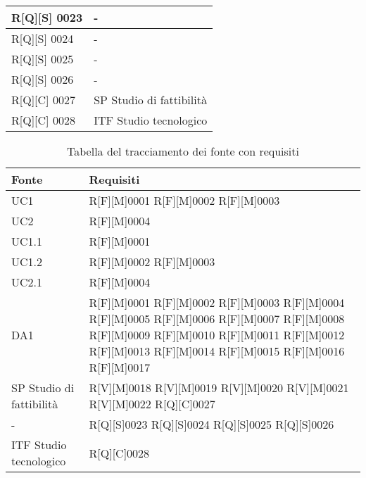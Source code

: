 \begin{center}
\begin{longtable}{|p{3cm}|p{3cm}|}
            \hline
            R[Q][S] 0023    & -  \\
            \hline
            R[Q][S] 0024    & -  \\
            \hline
            R[Q][S] 0025    & -  \\
            \hline
            R[Q][S] 0026    & -  \\
            \hline
            R[Q][C] 0027    & SP Studio di fattibilità  \\
            \hline
            R[Q][C] 0028    & ITF Studio tecnologico  \\
            \hline
            \end{longtable}
            \end{center}%

    \begin{center}
        \begin{longtable}{|p{3cm}|p{3cm}|}%
        \caption{Tabella del tracciamento dei fonte con requisiti}
        \label{tab:fonti-req-sp}
        \endfirsthead
        \endhead
        \hline
        \textbf{Fonte}  & \textbf{Requisiti}\\
        \hline
        UC1    & R[F][M]0001
        R[F][M]0002
        R[F][M]0003  \\
        \hline
        UC2    & R[F][M]0004  \\
        \hline
        UC1.1    & R[F][M]0001  \\
        \hline
        UC1.2    & 
        R[F][M]0002
        R[F][M]0003  \\
        \hline
        UC2.1    & R[F][M]0004  \\
        \hline
        DA1    & R[F][M]0001
        R[F][M]0002
        R[F][M]0003
        R[F][M]0004
        R[F][M]0005
        R[F][M]0006
        R[F][M]0007
        R[F][M]0008
        R[F][M]0009
        R[F][M]0010
        R[F][M]0011
        R[F][M]0012
        R[F][M]0013
        R[F][M]0014
        R[F][M]0015
        R[F][M]0016
        R[F][M]0017  \\
        \hline
        SP Studio di fattibilità    & 
        R[V][M]0018
        R[V][M]0019
        R[V][M]0020
        R[V][M]0021
        R[V][M]0022
        R[Q][C]0027  \\
        \hline
        -    & 
        R[Q][S]0023
        R[Q][S]0024
        R[Q][S]0025
        R[Q][S]0026  \\
        \hline
        ITF Studio tecnologico    & R[Q][C]0028  \\
        \hline

        \end{longtable}
        \end{center}%

